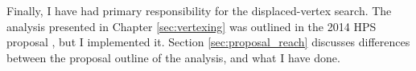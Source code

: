 Finally, I have had primary responsibility for the displaced-vertex search.
The analysis presented in Chapter \ref{sec:vertexing} was outlined in the 2014 HPS proposal \cite{collaboration_heavy_2013}, but I implemented it.
Section \ref{sec:proposal_reach} discusses differences between the proposal outline of the analysis, and what I have done.
